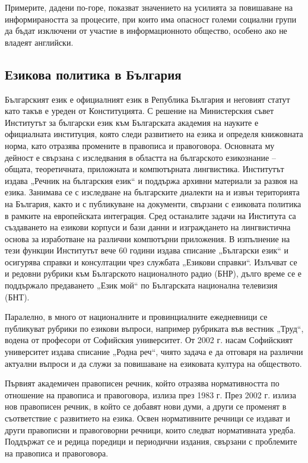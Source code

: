 \documentclass[]{../../metanetpaper}
\begin{document}
\begin{multicols}{2}
Примерите, дадени по-горе, показват значението на усилията за повишаване на информираността за процесите, при които има опасност големи социални
 групи
 да
 бъдат
 изключени
 от
 участие
 в
 информационното общество, особено ако не владеят
 английски.

\subsection{Езикова политика в България}


Българският език е официалният език в Република България и неговият статут като такъв е уреден от Конституцията. С
 решение на Министерския съвет Институтът за български език към Българската академия на науките е
 официалната институция, която следи развитието на
 езика и определя книжовната норма, като отразява промените в правописа и правоговора. Основната му дейност е свързана с изследвания в областта на българското езикознание – общата, теоретичната, приложната и компютърната лингвистика. Институтът издава „Речник на българския език“ и поддържа архивни
 материали за развоя на езика. Занимава се с изследване
 на българските диалекти на и извън територията на
 България, както и с публикуване на документи, свързани
 с езиковата политика в рамките на европейската
 интеграция. Сред останалите задачи на Института са
 създаването на езикови корпуси и бази данни и
 изграждането на лингвистична основа за изработване на
 различни компютърни приложения. В изпълнение на
 тези функции Институтът вече 60 години издава
 списание „Български език“ и
 осигурява справки и консултации чрез службата
 „Езикови справки“. Излъчват се и редовни рубрики към
 Българското националното радио (БНР), дълго време се е поддържало предаването „Език
 мой“ по Българската национална телевизия (БНТ).
 
Паралелно, в много от националните и провинциалните ежедневници се публикуват рубрики по езикови въпроси,
 например рубриката във вестник „Труд“, водена от
 професори от Софийския университет. От 2002 г. насам
 Софийският университет издава списание „Родна реч“,
 чиято задача е да отговаря на различни актуални
 въпроси и да служи за повишаване на езиковата култура на
 обществото.


Първият академичен правописен речник,
 който отразява нормативността по отношение на
 правописа и правоговора, излиза през 1983 г. През 2002
 г. излиза нов правописен речник, в който се добавят
 нови думи, а други се променят в съответствие с
 развитието на езика.
 Освен нормативните речници се издават и други
 правописни и правоговорни речници, които следват
 нормативната уредба. Поддържат се и редица поредици и периодични издания,
 свързани с проблемите на правописа и правоговора.


\end{multicols}
\end{document}

